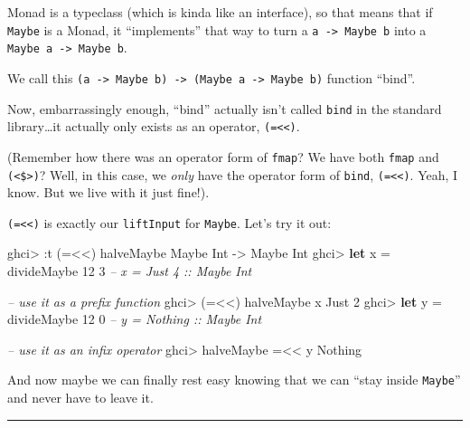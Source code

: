 \documentclass[]{article}
\newenvironment{Shaded}{}{}
\newcommand{\KeywordTok}[1]{\textcolor[rgb]{0.00,0.44,0.13}{\textbf{#1}}}
\newcommand{\DataTypeTok}[1]{\textcolor[rgb]{0.56,0.13,0.00}{#1}}
\newcommand{\DecValTok}[1]{\textcolor[rgb]{0.25,0.63,0.44}{#1}}
\newcommand{\CommentTok}[1]{\textcolor[rgb]{0.38,0.63,0.69}{\textit{#1}}}
\newcommand{\OtherTok}[1]{\textcolor[rgb]{0.00,0.44,0.13}{#1}}
\newcommand{\FunctionTok}[1]{\textcolor[rgb]{0.02,0.16,0.49}{#1}}
\newcommand{\NormalTok}[1]{#1}
\begin{document}
Monad is a typeclass (which is kinda like an interface), so that means that if
\texttt{Maybe} is a Monad, it ``implements'' that way to turn a
\texttt{a\ -\textgreater{}\ Maybe\ b} into a
\texttt{Maybe\ a\ -\textgreater{}\ Maybe\ b}.

We call this
\texttt{(a\ -\textgreater{}\ Maybe\ b)\ -\textgreater{}\ (Maybe\ a\ -\textgreater{}\ Maybe\ b)}
function ``bind''.

Now, embarrassingly enough, ``bind'' actually isn't called \texttt{bind} in the
standard library\ldots{}it actually only exists as an operator,
\texttt{(=\textless{}\textless{})}.

(Remember how there was an operator form of \texttt{fmap}? We have both
\texttt{fmap} and \texttt{(\textless{}\$\textgreater{})}? Well, in this case, we
\emph{only} have the operator form of \texttt{bind},
\texttt{(=\textless{}\textless{})}. Yeah, I know. But we live with it just
fine!).

\texttt{(=\textless{}\textless{})} is exactly our \texttt{liftInput} for
\texttt{Maybe}. Let's try it out:

\begin{Shaded}
\begin{Highlighting}[]
\NormalTok{ghci}\FunctionTok{>} \FunctionTok{:}\NormalTok{t (}\FunctionTok{=<<}\NormalTok{) halveMaybe}
\DataTypeTok{Maybe} \DataTypeTok{Int} \OtherTok{->} \DataTypeTok{Maybe} \DataTypeTok{Int}
\NormalTok{ghci}\FunctionTok{>} \KeywordTok{let}\NormalTok{ x }\FunctionTok{=}\NormalTok{ divideMaybe }\DecValTok{12} \DecValTok{3}     \CommentTok{-- x = Just 4 :: Maybe Int}

\CommentTok{-- use it as a prefix function}
\NormalTok{ghci}\FunctionTok{>}\NormalTok{ (}\FunctionTok{=<<}\NormalTok{) halveMaybe x}
\DataTypeTok{Just} \DecValTok{2}
\NormalTok{ghci}\FunctionTok{>} \KeywordTok{let}\NormalTok{ y }\FunctionTok{=}\NormalTok{ divideMaybe }\DecValTok{12} \DecValTok{0}     \CommentTok{-- y = Nothing :: Maybe Int}

\CommentTok{-- use it as an infix operator}
\NormalTok{ghci}\FunctionTok{>}\NormalTok{ halveMaybe }\FunctionTok{=<<}\NormalTok{ y}
\DataTypeTok{Nothing}
\end{Highlighting}
\end{Shaded}

And now maybe we can finally rest easy knowing that we can ``stay inside
\texttt{Maybe}'' and never have to leave it.

\begin{center}\rule{0.5\linewidth}{\linethickness}\end{center}
\end{document}
